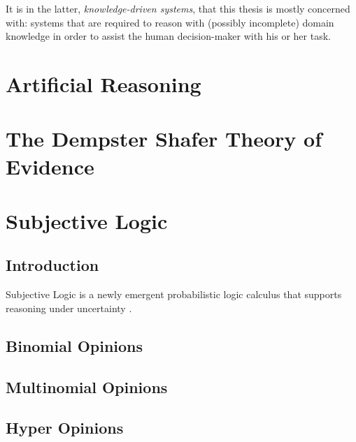 \documentclass[thesis.tex]{subfiles}
\begin{document}
It is in the latter, \emph{knowledge-driven systems}, that this thesis is mostly concerned with: systems
that are required to reason with (possibly incomplete) domain knowledge in order to assist the human
decision-maker with his or her task.





\section{Artificial Reasoning}






\section{The Dempster Shafer Theory of Evidence}











\section{Subjective Logic}

\subsection{Introduction}

Subjective Logic is a newly emergent probabilistic logic calculus that supports reasoning
under uncertainty \cite{josang2001logic}.














\subsection{Binomial Opinions}

\subsection{Multinomial Opinions}

\subsection{Hyper Opinions}
\end{document}
